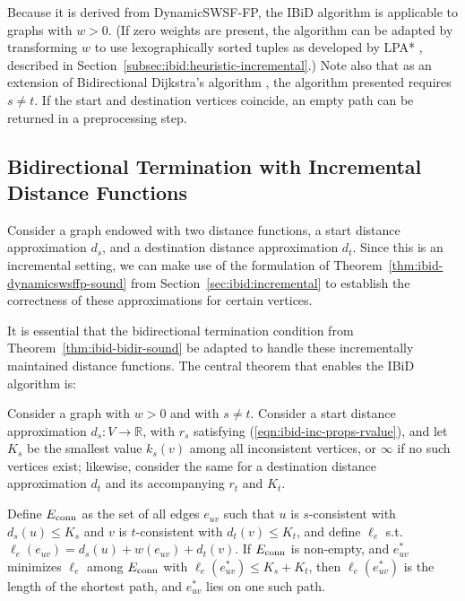 Because it is derived from DynamicSWSF-FP,
the IBiD algorithm is applicable to graphs with $w > 0$.
(If zero weights are present,
the algorithm can be adapted by transforming $w$ to use
lexographically sorted tuples as developed
by LPA* \citep{koenig2004lpastar},
described in Section~\ref{subsec:ibid:heuristic-incremental}.)
Note also that as an extension of
Bidirectional Dijkstra's algorithm \citep{goldberg2005spexternalmemory},
the algorithm presented requires $s \neq t$.
If the start and destination vertices coincide,
an empty path can be returned in a preprocessing step.

\subsection{Bidirectional Termination with Incremental Distance Functions}

Consider a graph endowed with two distance functions,
a start distance approximation $d_s$,
and a destination distance approximation $d_t$.
Since this is an incremental setting,
we can make use of the formulation
of Theorem~\ref{thm:ibid-dynamicswsffp-sound}
from Section~\ref{sec:ibid:incremental}
to establish the correctness of these approximations
for certain vertices.

It is essential that the bidirectional termination condition from
Theorem~\ref{thm:ibid-bidir-sound} be adapted to
handle these incrementally maintained distance functions.
The central theorem that enables the IBiD algorithm is:

\begin{theorem}
Consider a graph with $w > 0$ and with $s \neq t$.
Consider a start distance approximation $d_s: V \rightarrow \mathbb{R}$,
with $r_s$ satisfying (\ref{eqn:ibid-inc-props-rvalue}),
and let $K_s$ be the smallest value $k_s(v)$
among all inconsistent vertices,
or $\infty$ if no such vertices exist;
likewise, consider the same for a destination distance approximation
$d_t$ and its accompanying $r_t$ and $K_t$.

Define $E_{\mbox{\scriptsize conn}}$ as the set of all edges $e_{uv}$ such that
$u$ is $s$-consistent with $d_s(u) \leq K_s$
and $v$ is $t$-consistent with $d_t(v) \leq K_t$,
and define $\ell_e$ s.t. $\ell_e(e_{uv}) = d_s(u) + w(e_{uv}) + d_t(v)$.
If $E_{\mbox{\scriptsize conn}}$ is non-empty,
and $e^*_{uv}$ minimizes $\ell_e$
among $E_{\mbox{\scriptsize conn}}$ with $\ell_e(e^*_{uv}) \leq K_s + K_t$,
then $\ell_e(e^*_{uv})$ is the length of the shortest path,
and $e^*_{uv}$ lies on one such path.
\label{thm:ibid-sound}
\end{theorem}

